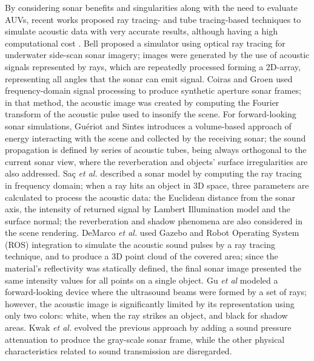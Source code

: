 \documentclass[final,5p,times]{elsarticle}
\begin{document}
By considering sonar benefits and singularities along with the need to evaluate AUVs, recent works proposed ray tracing- and tube tracing-based techniques to simulate acoustic data with very accurate results, although having a high computational cost \cite{bell1997,coiras2009,gueriot2010,sac2015,demarco2015,gu2013,kwak2015}. Bell \cite{bell1997} proposed a simulator using optical ray tracing for underwater side-scan sonar imagery; images were generated by the use of acoustic signals represented by rays, which are repeatedly processed forming a 2D-array, representing all angles that the sonar can emit signal. Coiras and Groen \cite{coiras2009} used frequency-domain signal processing to produce synthetic aperture sonar frames; in that method, the acoustic image was created by computing the Fourier transform of the acoustic pulse used to insonify the scene. For forward-looking sonar simulations, Guériot and Sintes \cite{gueriot2010} introduces a volume-based approach of energy interacting with the scene and collected by the receiving sonar; the sound propagation is defined by series of acoustic tubes, being always orthogonal to the current sonar view, where the reverberation and objects' surface irregularities are also addressed. Saç \textit{et al.} \cite{sac2015} described a sonar model by computing the ray tracing in frequency domain; when a ray hits an object in 3D space, three parameters are calculated to process the acoustic data: the Euclidean distance from the sonar axis, the intensity of returned signal by Lambert Illumination model and the surface normal; the reverberation and shadow phenomena are also considered in the scene rendering. DeMarco \textit{et al.} \cite{demarco2015} used Gazebo and Robot Operating System (ROS) \cite{quigley2009} integration to simulate the acoustic sound pulses by a ray tracing technique, and to produce a 3D point cloud of the covered area; since the material's reflectivity was statically defined, the final sonar image presented the same intensity values for all points on a single object. Gu \textit{et al} \cite{gu2013} modeled a forward-looking device where the ultrasound beams were formed by a set of rays; however, the acoustic image is significantly limited by its representation using only two colors: white, when the ray strikes an object, and black for shadow areas. Kwak \textit{et al.} \cite{kwak2015} evolved the previous approach by adding a sound pressure attenuation to produce the gray-scale sonar frame, while the other physical characteristics related to sound transmission are disregarded.
\end{document}
